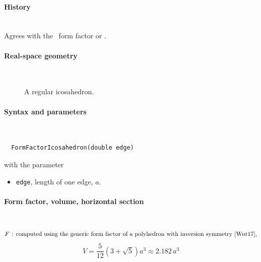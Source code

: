 \paragraph{History}\strut\\
Agrees with the \IsGISAXS\ form factor
\cite[Eq.~2.42, with wrong sign in the $z$-dependent phase factor]{Laz06}
or  \cite[Eq.~229]{ReLL09}.


 \label{SIcosahedron}

\paragraph{Real-space geometry}\strut\\

\begin{figure}[H]
\strut\hfill
{}
\hfill\strut
\caption{A regular icosahedron.}
\end{figure}

\FloatBarrier

\paragraph{Syntax and parameters}\strut\\[-2ex plus .2ex minus .2ex]
\begin{lstlisting}
  FormFactorIcosahedron(double edge)
\end{lstlisting}
with the parameter
\begin{itemize}
\item \texttt{edge}, length of one edge, $a$.
\end{itemize}

\paragraph{Form factor, volume, horizontal section}\strut\\
\begin{equation*}
  F \text{~: computed using the generic form factor of a polyhedron
             with inversion symmetry~\cite{Wut17},}
\end{equation*}
\begin{equation*}
  V= \frac{5}{12} (3+\sqrt5)a^3 \approx 2.182\,a^3
\end{equation*}

